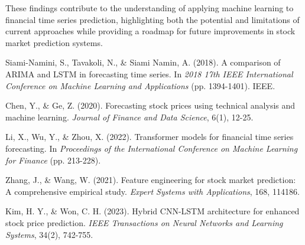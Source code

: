\documentclass[sigconf]{acmart}
\begin{document}
These findings contribute to the understanding of applying machine learning to financial time series prediction, highlighting both the potential and limitations of current approaches while providing a roadmap for future improvements in stock market prediction systems.



\begin{thebibliography}{5}
\raggedright

Siami-Namini, S., Tavakoli, N., \& Siami Namin, A. (2018).
\newblock A comparison of ARIMA and LSTM in forecasting time series.
\newblock In \textit{2018 17th IEEE International Conference on Machine Learning and Applications} (pp. 1394-1401). IEEE.

Chen, Y., \& Ge, Z. (2020).
\newblock Forecasting stock prices using technical analysis and machine learning.
\newblock \textit{Journal of Finance and Data Science}, 6(1), 12-25.

Li, X., Wu, Y., \& Zhou, X. (2022).
\newblock Transformer models for financial time series forecasting.
\newblock In \textit{Proceedings of the International Conference on Machine Learning for Finance} (pp. 213-228).

Zhang, J., \& Wang, W. (2021).
\newblock Feature engineering for stock market prediction: A comprehensive empirical study.
\newblock \textit{Expert Systems with Applications}, 168, 114186.

Kim, H. Y., \& Won, C. H. (2023).
\newblock Hybrid CNN-LSTM architecture for enhanced stock price prediction.
\newblock \textit{IEEE Transactions on Neural Networks and Learning Systems}, 34(2), 742-755.
\end{thebibliography}
\end{document}
